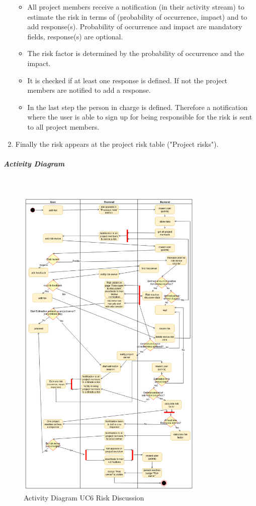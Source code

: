 \begin{enumerate}
\begin{itemize}
		\item All project members receive a notification (in their activity stream) to estimate the risk in terms of (probability of occurrence, impact) and to add response(s). Probability of occurrence and impact are mandatory fields, response(s) are optional.
		\item The risk factor is determined by the probability of occurrence and the impact.
		\item It is checked if at least one response is defined. If not the project members are notified to add a response.
		\item In the last step the person in charge is defined. Therefore a notification where the user is able to sign up for being responsible for the risk is sent to all project members.  
	\end{itemize}

	\item Finally the risk appears at the project risk table ("Project risks").
	
\end{enumerate}

\subparagraph{Activity Diagram}\mbox{}\\
\begin{figure}[!hp]
	\centering
	\includegraphics[width=0.8\textwidth]{Content/Domain/UC6RiskDiscussion.png}
	\caption{Activity Diagram \ac{UC}6 Risk Discussion}
	\label{fig:label66}
\end{figure}

